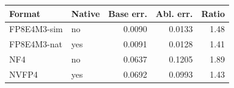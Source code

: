 \setlength{\tabcolsep}{3.5pt}
\begin{tabular}{llrrr}
\toprule
Format & Native & Base err. & Abl. err. & Ratio \\
\midrule
FP8E4M3-sim & no & 0.0090 & 0.0133 & 1.48 \\
FP8E4M3-nat & yes & 0.0091 & 0.0128 & 1.41 \\
NF4 & no & 0.0637 & 0.1205 & 1.89 \\
NVFP4 & yes & 0.0692 & 0.0993 & 1.43 \\
\bottomrule
\end{tabular}
